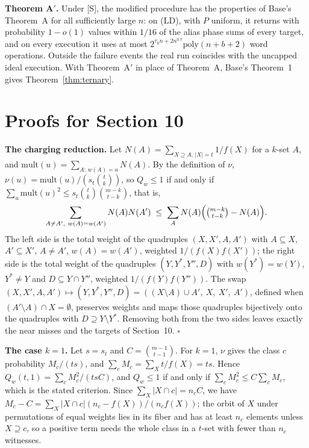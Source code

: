 \documentclass[11pt]{article}
\newcommand{\poly}{\mathrm{poly}}
\theoremstyle{plain}
\begin{document}
\textbf{Theorem A$'$.} Under [S], the modified procedure has the properties of Base's Theorem~A for all sufficiently large $n$: on (LD), with $P$ uniform, it returns with probability $1 - o(1)$ values within $1/16$ of the alias phase sums of every target, and on every execution it uses at most $2^{\tau_0 n + 2n^{0.7}}\poly(n + b + 2)$ word operations. Outside the failure events the real run coincides with the uncapped ideal execution. With Theorem~A$'$ in place of Theorem~A, Base's Theorem~1 gives Theorem~\ref{thm:ternary}.

\section{Proofs for Section 10}\label{app:B}

\textbf{The charging reduction.} Let $N(A) = \sum_{X \supseteq A,\,|X| = t} 1/f(X)$ for a $k$-set $A$, and $\mathrm{mult}(u) = \sum_{A:\,w(A) = u} N(A)$. By the definition of $\nu$, $\nu(u) = \mathrm{mult}(u)/(s_t\binom{t}{k})$, so $Q_w \le 1$ if and only if $\sum_u \mathrm{mult}(u)^2 \le s_t \binom{t}{k}\binom{m-k}{t-k}$, that is,
\[\sum_{A \ne A',\ w(A) = w(A')} N(A)N(A') \;\le\; \sum_A N(A)\Bigl(\tbinom{m-k}{t-k} - N(A)\Bigr).\]
The left side is the total weight of the quadruples $(X, X', A, A')$ with $A \subseteq X$, $A' \subseteq X'$, $A \ne A'$, $w(A) = w(A')$, weighted $1/(f(X)f(X'))$; the right side is the total weight of the quadruples $(Y, Y^*, Y'', D)$ with $w(Y^*) = w(Y)$, $Y^* \ne Y$ and $D \subseteq Y \cap Y''$, weighted $1/(f(Y)f(Y''))$. The swap $(X, X', A, A') \mapsto (Y, Y^*, Y'', D) = ((X\setminus A)\cup A',\ X,\ X',\ A')$, defined when $(A' \setminus A) \cap X = \emptyset$, preserves weights and maps those quadruples bijectively onto the quadruples with $D \supseteq Y \setminus Y^*$. Removing both from the two sides leaves exactly the near misses and the targets of Section~10. $\square$

\textbf{The case $k = 1$.} Let $s = s_t$ and $C = \binom{m-1}{t-1}$. For $k = 1$, $\nu$ gives the class $c$ probability $M_c/(ts)$, and $\sum_c M_c = \sum_X t/f(X) = ts$. Hence $Q_w(t,1) = \sum_c M_c^2/(tsC)$, and $Q_w \le 1$ if and only if $\sum_c M_c^2 \le C\sum_c M_c$, which is the stated criterion. Since $\sum_X |X \cap c| = n_c C$, we have $M_c - C = \sum_X |X\cap c|(n_c - f(X))/(n_c f(X))$; the orbit of $X$ under permutations of equal weights lies in its fiber and has at least $n_c$ elements unless $X \supseteq c$, so a positive term needs the whole class in a $t$-set with fewer than $n_c$ witnesses.
\end{document}
